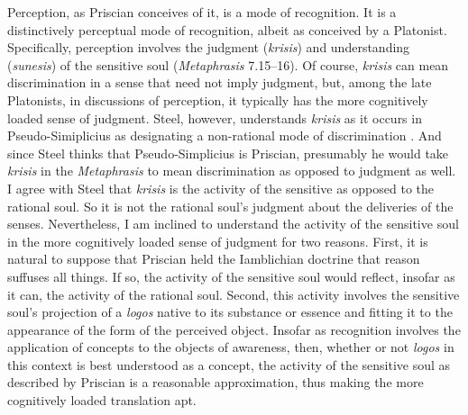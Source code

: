 \documentclass[12pt]{article}
\begin{document}
Perception, as Priscian conceives of it, is a mode of recognition. It is a distinctively perceptual mode of recognition, albeit as conceived by a Platonist. Specifically, perception involves the judgment (\emph{krisis}) and understanding (\emph{sunesis}) of the sensitive soul (\emph{Metaphrasis} 7.15--16). Of course, \emph{krisis} can mean discrimination in a sense that need not imply judgment, but, among the late Platonists, in discussions of perception, it typically has the more cognitively loaded sense of judgment. Steel, however, understands \emph{krisis} as it occurs in Pseudo-Simiplicius as designating a non-rational mode of discrimination \citep[see Lautner's note in][222 n.131]{Sorabji:1997ly}. And since Steel thinks that Pseudo-Simplicius is Priscian, presumably he would take \emph{krisis} in the \emph{Metaphrasis} to mean discrimination as opposed to judgment as well. I agree with Steel that \emph{krisis} is the activity of the sensitive as opposed to the rational soul. So it is not the rational soul's judgment about the deliveries of the senses. Nevertheless, I am inclined to understand the activity of the sensitive soul in the more cognitively loaded sense of judgment for two reasons. First, it is natural to suppose that Priscian held the Iamblichian doctrine that reason suffuses all things. If so, the activity of the sensitive soul would reflect, insofar as it can, the activity of the rational soul. Second, this activity involves the sensitive soul's projection of a \emph{logos} native to its substance or essence and fitting it to the appearance of the form of the perceived object. Insofar as recognition involves the application of concepts to the objects of awareness, then, whether or not \emph{logos} in this context is best understood as a concept, the activity of the sensitive soul as described by Priscian is a reasonable approximation, thus making the more cognitively loaded translation apt.
\end{document}
